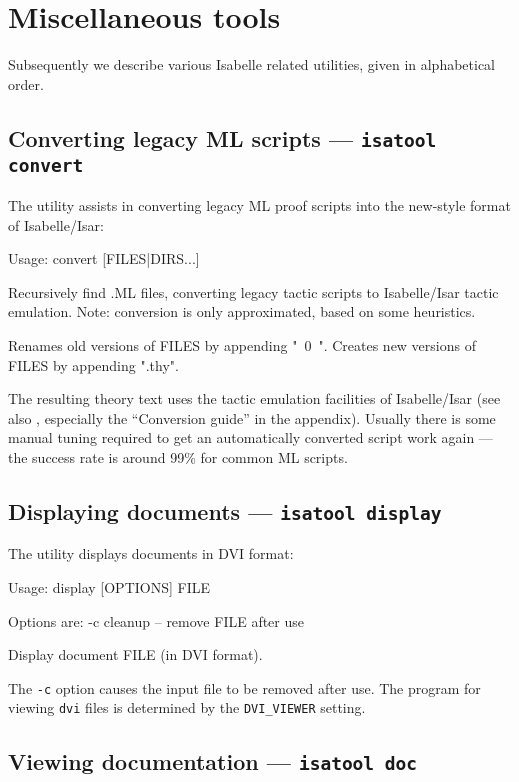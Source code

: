 

\chapter{Miscellaneous tools} \label{ch:tools}

Subsequently we describe various Isabelle related utilities, given in
alphabetical order.


\section{Converting legacy ML scripts --- \texttt{isatool convert}}

The  utility assists in converting legacy ML proof scripts
into the new-style format of Isabelle/Isar:
\begin{ttbox}
Usage: convert [FILES|DIRS...]

  Recursively find .ML files, converting legacy tactic scripts to
  Isabelle/Isar tactic emulation.
  Note: conversion is only approximated, based on some heuristics.

  Renames old versions of FILES by appending "~0~".
  Creates new versions of FILES by appending ".thy".
\end{ttbox}
The resulting theory text uses the tactic emulation facilities of
Isabelle/Isar (see also \cite{isabelle-ref}, especially the ``Conversion
guide'' in the appendix).  Usually there is some manual tuning required to get
an automatically converted script work again --- the success rate is around
99\% for common ML scripts.


\section{Displaying documents --- \texttt{isatool display}}

The  utility displays documents in DVI format:
\begin{ttbox}
Usage: display [OPTIONS] FILE

  Options are:
    -c           cleanup -- remove FILE after use

  Display document FILE (in DVI format).
\end{ttbox}

\medskip The \texttt{-c} option causes the input file to be removed after use.
The program for viewing \texttt{dvi} files is determined by the
\texttt{DVI_VIEWER} setting.


\section{Viewing documentation --- \texttt{isatool doc}} \label{sec:tool-doc}

